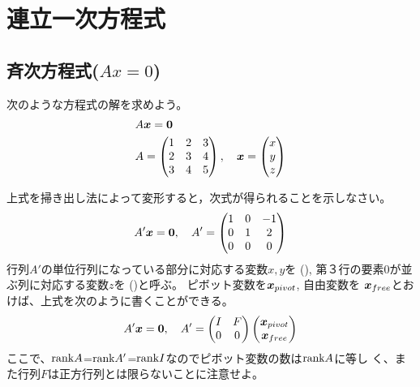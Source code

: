\documentclass[twocolumn,11pt]{jarticle}
\begin{document}
\section{連立一次方程式}
\subsection{斉次方程式($Ax=0$)}
次のような方程式の解を求めよう。
\begin{align}
  &A\boldsymbol{x}=\boldsymbol{0}\label{eq:Ax=0}\\
  &A=
  \begin{pmatrix}
    1 & 2 & 3\\
    2 & 3 & 4\\
    3 & 4 & 5
  \end{pmatrix},\quad
  \boldsymbol{x}=
  \begin{pmatrix}
    x\\
    y\\
    z
  \end{pmatrix}\notag
\end{align}

\nquestion
  上式を掃き出し法によって変形すると，次式が得られることを示しなさい。
  \begin{align}
    A'\vect{x}=\vect{0}\label{eq:A'x=0},\quad
    A'=
    \begin{pmatrix}
      1 & 0  & -1\\
      0 & 1 & 2\\
      0 & 0  & 0
    \end{pmatrix}%
  \end{align}
\comment
行列$A'$の単位行列になっている部分に対応する変数$x,y$を
(), 
第３行の要素0が並ぶ列に対応する変数$z$を
()と呼ぶ。
ピボット変数を$\boldsymbol{x}_{pivot}$, 自由変数を
$\boldsymbol{x}_{free}$とおけば、上式を次のように書くことができる。
  \begin{align}
    A'\boldsymbol{x}=\boldsymbol{0},\quad
    A'=
    \begin{pmatrix}
      I  & F \\
      0  & 0
    \end{pmatrix}
    \begin{pmatrix}
      \boldsymbol{x}_{pivot}\\
      \boldsymbol{x}_{free}
    \end{pmatrix}\notag
  \end{align}
  ここで、$\mbox{rank} A$=$\mbox{rank} A'$=$\mbox{rank} I$なのでピボット変数の数は$\mbox{rank} A$に等し
  く、また行列$F$は正方行列とは限らないことに注意せよ。
\end{document}
